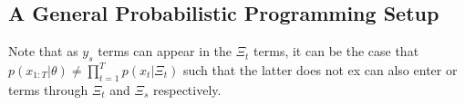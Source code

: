 \subsection{A General Probabilistic Programming Setup}
\label{sec:probprog:models:general}

Note that as $y_s$ terms can appear in the $\Xi_t$ terms, it can be the case that 
$p(x_{1:T} | \theta) \neq \prod_{t=1}^{T} p(x_t | \Xi_t)$ such that the latter does not
ex
can also enter \sample or \observe terms through $\Xi_t$ and $\Xi_s$ respectively.

